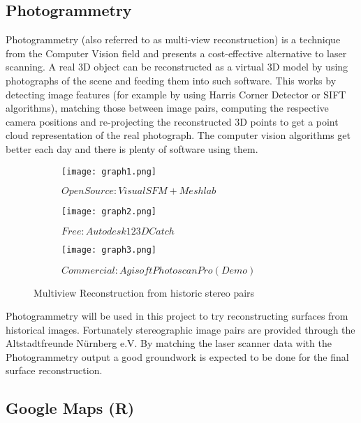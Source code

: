 \subsection{Photogrammetry}

Photogrammetry (also referred to as multi-view reconstruction) is a technique from the Computer Vision field and presents a cost-effective alternative to laser scanning. A real 3D object can be reconstructed as a virtual 3D model by using photographs of the scene and feeding them into such software. This works by detecting image features (for example by using Harris Corner Detector or SIFT algorithms), matching those between image pairs, computing the respective camera positions and re-projecting the reconstructed 3D points to get a point cloud representation of the real photograph\parencite[compare][p29]{bookProgrammingComputerVisionwithPython}.
The computer vision algorithms get better each day and there is plenty of software using them.

\begin{figure}[h]
	\centering
	\begin{subfigure}[b]{0.3\textwidth}
		\centering
		\texttt{[image: graph1.png]}
		\caption{$OpenSource: Visual SFM + Meshlab$}
		\label{fig:visualsfm meshlab}
	\end{subfigure}
	\hfill
	\begin{subfigure}[b]{0.3\textwidth}
		\centering
		\texttt{[image: graph2.png]}
		\caption{$Free: Autodesk 123D Catch$}
		\label{fig:123dcatch}
	\end{subfigure}
	\hfill
	\begin{subfigure}[b]{0.3\textwidth}
		\centering
		\texttt{[image: graph3.png]}
		\caption{$Commercial: Agisoft Photoscan Pro (Demo)$}
		\label{fig:photoscan pro}
	\end{subfigure}
	\caption{Multiview Reconstruction from historic stereo pairs}
	\label{fig:multiview reconstruction historic stereo}
\end{figure}

Photogrammetry will be used in this project to try reconstructing surfaces from historical images. Fortunately stereographic image pairs are provided through the Altstadtfreunde Nürnberg e.V. By matching the laser scanner data with the Photogrammetry output a good groundwork is expected to be done for the final surface reconstruction.

\subsection{Google Maps (R) }

